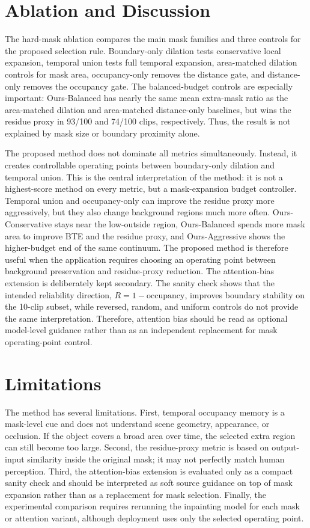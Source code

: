 \documentclass[nouppercase]{kaia}
\begin{document}
\section{Ablation and Discussion}
The hard-mask ablation compares the main mask families and three controls for the proposed selection rule. Boundary-only dilation tests conservative local expansion, temporal union tests full temporal expansion, area-matched dilation controls for mask area, occupancy-only removes the distance gate, and distance-only removes the occupancy gate. The balanced-budget controls are especially important: Ours-Balanced has nearly the same mean extra-mask ratio as the area-matched dilation and area-matched distance-only baselines, but wins the residue proxy in 93/100 and 74/100 clips, respectively. Thus, the result is not explained by mask size or boundary proximity alone.

The proposed method does not dominate all metrics simultaneously. Instead, it creates controllable operating points between boundary-only dilation and temporal union. This is the central interpretation of the method: it is not a highest-score method on every metric, but a mask-expansion budget controller. Temporal union and occupancy-only can improve the residue proxy more aggressively, but they also change background regions much more often. Ours-Conservative stays near the low-outside region, Ours-Balanced spends more mask area to improve BTE and the residue proxy, and Ours-Aggressive shows the higher-budget end of the same continuum. The proposed method is therefore useful when the application requires choosing an operating point between background preservation and residue-proxy reduction.
The attention-bias extension is deliberately kept secondary. The sanity check shows that the intended reliability direction, $R=1-\mathrm{occupancy}$, improves boundary stability on the 10-clip subset, while reversed, random, and uniform controls do not provide the same interpretation. Therefore, attention bias should be read as optional model-level guidance rather than as an independent replacement for mask operating-point control.

\section{Limitations}
The method has several limitations. First, temporal occupancy memory is a mask-level cue and does not understand scene geometry, appearance, or occlusion. If the object covers a broad area over time, the selected extra region can still become too large. Second, the residue-proxy metric is based on output-input similarity inside the original mask; it may not perfectly match human perception. Third, the attention-bias extension is evaluated only as a compact sanity check and should be interpreted as soft source guidance on top of mask expansion rather than as a replacement for mask selection. Finally, the experimental comparison requires rerunning the inpainting model for each mask or attention variant, although deployment uses only the selected operating point.
\end{document}
